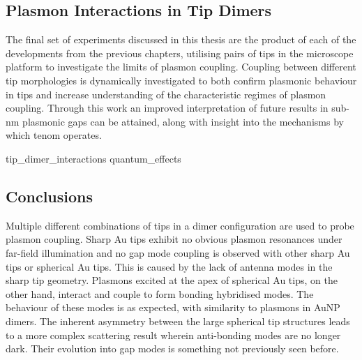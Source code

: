\documentclass[12pt, a4paper, twoside]{book}
\begin{document}
\begin{singlespace}
{\color{white}
\chapter{Plasmon Interactions in Tip Dimers}}
\label{ch:tip_interactions}
\end{singlespace}


The final set of experiments discussed in this thesis are the product of each of the developments from the previous chapters, utilising pairs of tips in the microscope platform to investigate the limits of plasmon coupling. Coupling between different tip morphologies is dynamically investigated to both confirm plasmonic behaviour in tips and increase understanding of the characteristic regimes of plasmon coupling. Through this work an improved interpretation of future results in sub-nm plasmonic gaps can be attained, along with insight into the mechanisms by which \gls{tenom} operates.

{tip_dimer_interactions}
{quantum_effects}

\section{Conclusions}

Multiple different combinations of tips in a dimer configuration are used to probe plasmon coupling. Sharp Au tips exhibit no obvious plasmon resonances under far-field illumination and no gap mode coupling is observed with other sharp Au tips or spherical Au tips. This is caused by the lack of antenna modes in the sharp tip geometry.
Plasmons excited at the apex of spherical Au tips, on the other hand, interact and couple to form bonding hybridised modes. The behaviour of these modes is as expected, with similarity to plasmons in AuNP dimers. The inherent asymmetry between the large spherical tip structures leads to a more complex scattering result wherein anti-bonding modes are no longer dark. Their evolution into gap modes is something not previously seen before.
\end{document}
